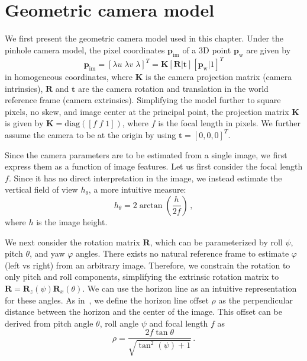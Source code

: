 \section{Geometric camera model}
\label{sec:camera-model}

We first present the geometric camera model used in this chapter. 
Under the pinhole camera model, the pixel coordinates $\mathbf{p}_\mathrm{im}$ of a 3D point $\mathbf{p}_\mathrm{w}$ are given by
%
\begin{equation}
\mathbf{p}_{\mathrm{im}} = [\lambda u \; \lambda v \; \lambda]^T = \mathbf{K} \left[\mathbf{R} | \mathbf{t}\right] \left[ \mathbf{p}_{\mathrm{w}} | 1 \right]^T
\end{equation}
%
in homogeneous coordinates, where $\mathbf{K}$ is the camera projection matrix (camera intrinsics), $\mathbf{R}$ and $\mathbf{t}$ are the camera rotation and translation in the world reference frame (camera extrinsics). Simplifying the model further to square pixels, no skew, and image center at the principal point, the projection matrix $\mathbf{K}$ is given by $\mathbf{K} = \mathrm{diag}([f \; f \; 1])$, where $f$ is the focal length in pixels. We further assume the camera to be at the origin by using $\mathbf{t} = \left[0, 0, 0\right]^T$. 

Since the camera parameters are to be estimated from a single image, we first express them as a function of image features. Let us first consider the focal length $f$. Since it has no direct interpretation in the image, we instead estimate the vertical field of view $h_\theta$, a more intuitive measure: 
%
\begin{equation}
h_{\theta} = 2 \arctan \left( \frac{ h }{ 2f } \right) \,,
\end{equation}
%
where $h$ is the image height.

We next consider the rotation matrix $\mathbf{R}$, which can be parameterized by roll $\psi$, pitch $\theta$, and yaw $\varphi$ angles. There exists no natural reference frame to estimate $\varphi$ (left vs right) from an arbitrary image. Therefore, we constrain the rotation to only pitch and roll components, simplifying the extrinsic rotation matrix to $\mathbf{R} = \mathbf{R}_z(\psi) \mathbf{R}_x(\theta)$. We can use the horizon line as an intuitive representation for these angles. As in~\cite{Workman2016}, we define the horizon line offset $\rho$ as the perpendicular distance between the horizon and the center of the image. This offset can be derived from pitch angle $\theta$, roll angle $\psi$ and focal length $f$ as 
%
\begin{equation}
\rho = \frac{2 f \tan\theta}{\sqrt{\tan^2\left( \psi \right) + 1}} \,.
\label{eq:horizon_offset}
\end{equation}
%

